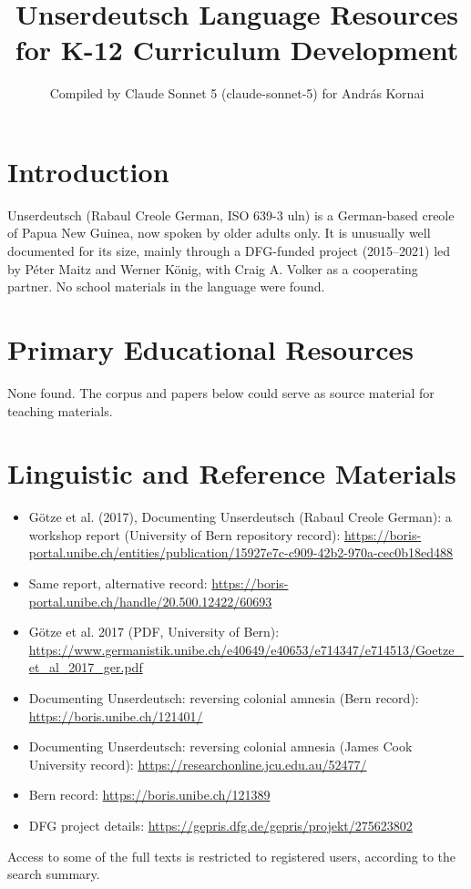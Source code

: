 \documentclass[12pt]{article}
\title{Unserdeutsch Language Resources for K-12 Curriculum Development}
\author{Compiled by Claude Sonnet 5 (claude-sonnet-5) for Andr\'as Kornai}
\date{}
\begin{document}
\maketitle

\section{Introduction}
Unserdeutsch (Rabaul Creole German, ISO 639-3 uln) is a German-based creole of Papua New Guinea, now spoken by older adults only. It is unusually well documented for its size, mainly through a DFG-funded project (2015--2021) led by P\'eter Maitz and Werner K\"onig, with Craig A. Volker as a cooperating partner. No school materials in the language were found.

\section{Primary Educational Resources}
None found. The corpus and papers below could serve as source material for teaching materials.

\section{Linguistic and Reference Materials}
\begin{itemize}
\item G\"otze et al. (2017), Documenting Unserdeutsch (Rabaul Creole German): a workshop report (University of Bern repository record): \url{https://boris-portal.unibe.ch/entities/publication/15927e7c-c909-42b2-970a-cec0b18ed488}
\item Same report, alternative record: \url{https://boris-portal.unibe.ch/handle/20.500.12422/60693}
\item G\"otze et al. 2017 (PDF, University of Bern): \url{https://www.germanistik.unibe.ch/e40649/e40653/e714347/e714513/Goetze_et_al_2017_ger.pdf}
\item Documenting Unserdeutsch: reversing colonial amnesia (Bern record): \url{https://boris.unibe.ch/121401/}
\item Documenting Unserdeutsch: reversing colonial amnesia (James Cook University record): \url{https://researchonline.jcu.edu.au/52477/}
\item Bern record: \url{https://boris.unibe.ch/121389}
\item DFG project details: \url{https://gepris.dfg.de/gepris/projekt/275623802}
\end{itemize}
Access to some of the full texts is restricted to registered users, according to the search summary.
\end{document}
